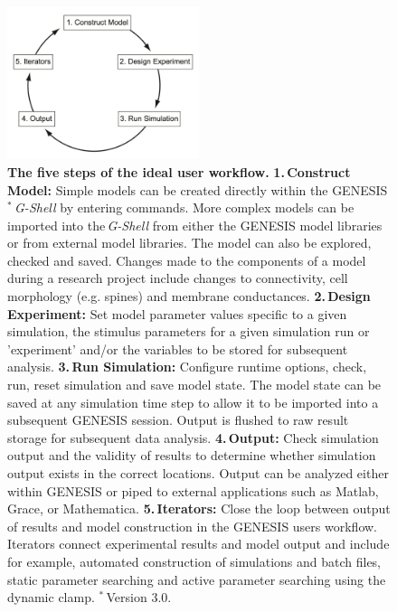 \documentclass[10pt,letterpaper]{article}
\begin{document}
\begin{figure}[h!t]
  \begin{center}
    \includegraphics[width=0.50\textwidth]{figures/user-workflow.pdf}
  \end{center}
  \vspace*{-\lineskip}
  \caption{ \small{{\bf The five steps of the ideal user workflow.} {\textbf{1.\,Construct Model:} Simple models can be created directly within the GENESIS$^*$\,\textit{G-Shell} by entering commands. More complex models can be imported into the\,\textit{G-Shell} from either the GENESIS model libraries or from external model libraries. The model can also be explored, checked and saved. Changes made to the components of a model during a research project include changes to connectivity, cell morphology (e.g. spines) and membrane conductances. \textbf{2.\,Design Experiment:} Set model parameter values specific to a given simulation, the stimulus parameters for a given simulation run or 'experiment' and/or the variables to be stored for subsequent analysis.} \textbf{3.\,Run Simulation:} Configure runtime options, check, run, reset simulation and save model state. The model state can be saved at any simulation time step to allow it to be imported into a subsequent GENESIS session. Output is flushed to raw result storage for subsequent data analysis. \textbf{4.\,Output:} Check simulation output and the validity of results to determine whether simulation output exists in the correct locations. Output can be analyzed either within GENESIS or piped to external applications such as Matlab, Grace, or Mathematica. \textbf{5.\,Iterators:} Close the loop between output of results and model construction in the GENESIS users workflow. Iterators connect experimental results and model output and include for example, automated construction of simulations and batch files, static parameter searching and active parameter searching using the dynamic clamp. $^*$\,Version 3.0.}}
  \label{fig4}
\end{figure}
\end{document}
